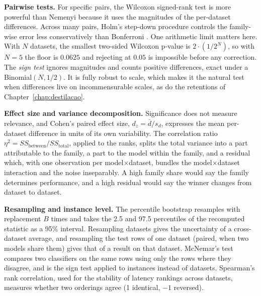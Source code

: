 \textbf{Pairwise tests.} For specific pairs, the Wilcoxon
signed-rank test \citep{wilcoxon1945} is more powerful than Nemenyi
because it uses the magnitudes of the per-dataset differences. Across
many pairs, Holm's step-down procedure controls the family-wise
error less conservatively than Bonferroni \citep{holm1979}. One
arithmetic limit matters here. With $N$ datasets, the smallest two-sided Wilcoxon p-value is $2 \cdot (1/2^N)$, so with $N = 5$ the floor is $0.0625$ and rejecting at $0.05$ is impossible
before any correction. The \emph{sign test} \citep{conover1999}
ignores magnitudes and counts positive differences, exact under a Binomial$(N, 1/2)$. It is fully robust to scale, which makes it the natural test when differences live on incommensurable scales, as do the retentions of Chapter~\ref{chap:destilacao}.

\textbf{Effect size and variance decomposition.} Significance does
not measure relevance, and Cohen's paired effect size, $d_z = \bar{d} /
s_d$, expresses the mean per-dataset difference in units of its own
variability. The correlation ratio $\eta^2 =
\mathit{SS}_{\text{between}} / \mathit{SS}_{\text{total}}$, applied
to the ranks, splits the total variance into a part attributable to the family, a part to the model within
the family, and a residual which, with one observation per model$\times$dataset, bundles the model$\times$dataset
interaction and the noise inseparably. A high
family share would say the family determines performance, and a high residual would say the winner changes from dataset to dataset.

\textbf{Resampling and instance level.} The percentile bootstrap
\citep{efron1993} resamples with replacement $B$ times and takes the
2.5 and 97.5 percentiles of the recomputed statistic as a 95\%
interval. Resampling datasets gives the uncertainty of a
cross-dataset average, and resampling the test rows of one dataset (paired, when two models share them) gives that of a result on that dataset. McNemar's test \citep{mcnemar1947} compares
two classifiers on the same rows using only the rows where they disagree, and is the sign test applied to instances instead of
datasets. Spearman's rank correlation, used for the stability
of latency rankings across datasets, measures whether two orderings
agree (1 identical, $-1$ reversed).

